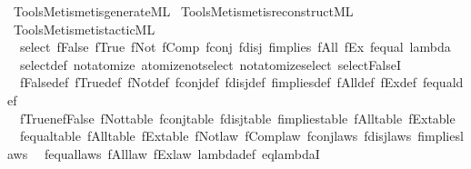 \begin{isabellebody}
%
\endisadelimdocument
%
\isadelimML
%
\endisadelimML
%
\isatagML
{}\isamarkupfalse%
\ {\isacartoucheopen}Tools{\isacharslash}{\kern0pt}Metis{\isacharslash}{\kern0pt}metis{\isacharunderscore}{\kern0pt}generate{\isachardot}{\kern0pt}ML{\isacartoucheclose}\isanewline
{}\isamarkupfalse%
\ {\isacartoucheopen}Tools{\isacharslash}{\kern0pt}Metis{\isacharslash}{\kern0pt}metis{\isacharunderscore}{\kern0pt}reconstruct{\isachardot}{\kern0pt}ML{\isacartoucheclose}\isanewline
{}\isamarkupfalse%
\ {\isacartoucheopen}Tools{\isacharslash}{\kern0pt}Metis{\isacharslash}{\kern0pt}metis{\isacharunderscore}{\kern0pt}tactic{\isachardot}{\kern0pt}ML{\isacartoucheclose}%
\endisatagML
{\isafoldML}%
%
\isadelimML
\isanewline
%
\endisadelimML
\isanewline
{}\isamarkupfalse%
\ {\isacharparenleft}{\kern0pt}\ select\ fFalse\ fTrue\ fNot\ fComp\ fconj\ fdisj\ fimplies\ fAll\ fEx\ fequal\ lambda\isanewline
{}\isamarkupfalse%
\ {\isacharparenleft}{\kern0pt}\ select{\isacharunderscore}{\kern0pt}def\ not{\isacharunderscore}{\kern0pt}atomize\ atomize{\isacharunderscore}{\kern0pt}not{\isacharunderscore}{\kern0pt}select\ not{\isacharunderscore}{\kern0pt}atomize{\isacharunderscore}{\kern0pt}select\ select{\isacharunderscore}{\kern0pt}FalseI\isanewline
\ \ fFalse{\isacharunderscore}{\kern0pt}def\ fTrue{\isacharunderscore}{\kern0pt}def\ fNot{\isacharunderscore}{\kern0pt}def\ fconj{\isacharunderscore}{\kern0pt}def\ fdisj{\isacharunderscore}{\kern0pt}def\ fimplies{\isacharunderscore}{\kern0pt}def\ fAll{\isacharunderscore}{\kern0pt}def\ fEx{\isacharunderscore}{\kern0pt}def\ fequal{\isacharunderscore}{\kern0pt}def\isanewline
\ \ fTrue{\isacharunderscore}{\kern0pt}ne{\isacharunderscore}{\kern0pt}fFalse\ fNot{\isacharunderscore}{\kern0pt}table\ fconj{\isacharunderscore}{\kern0pt}table\ fdisj{\isacharunderscore}{\kern0pt}table\ fimplies{\isacharunderscore}{\kern0pt}table\ fAll{\isacharunderscore}{\kern0pt}table\ fEx{\isacharunderscore}{\kern0pt}table\isanewline
\ \ fequal{\isacharunderscore}{\kern0pt}table\ fAll{\isacharunderscore}{\kern0pt}table\ fEx{\isacharunderscore}{\kern0pt}table\ fNot{\isacharunderscore}{\kern0pt}law\ fComp{\isacharunderscore}{\kern0pt}law\ fconj{\isacharunderscore}{\kern0pt}laws\ fdisj{\isacharunderscore}{\kern0pt}laws\ fimplies{\isacharunderscore}{\kern0pt}laws\isanewline
\ \ fequal{\isacharunderscore}{\kern0pt}laws\ fAll{\isacharunderscore}{\kern0pt}law\ fEx{\isacharunderscore}{\kern0pt}law\ lambda{\isacharunderscore}{\kern0pt}def\ eq{\isacharunderscore}{\kern0pt}lambdaI\isanewline
%
\isadelimtheory
\isanewline
%
\endisadelimtheory
%
\isatagtheory
{}\isamarkupfalse%
%
\endisatagtheory
{\isafoldtheory}%
%
\isadelimtheory
%
\endisadelimtheory
%
\end{isabellebody}%
